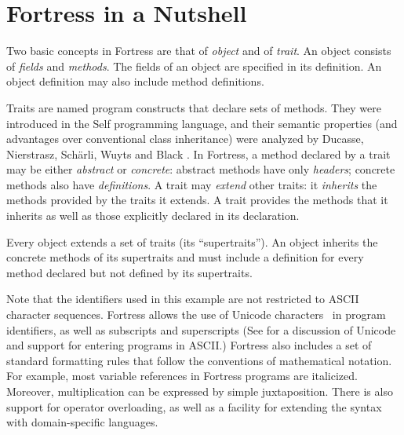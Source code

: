 %
%
%
%

\section{Fortress in a Nutshell}


Two basic concepts in Fortress are that of
\emph{object} and of \emph{trait}.
An object consists of \emph{fields} and \emph{methods}.
The fields of an object are specified in its definition.
An object definition may also include method definitions.

Traits are named
program constructs that declare sets of methods.
They were introduced in the Self programming language,
and their semantic properties
(and advantages over conventional class inheritance)
were analyzed
by Ducasse, Nierstrasz, Sch{\"a}rli, Wuyts and
  Black \cite{traits}.
In Fortress, a method declared by a trait
may be either \emph{abstract}
or \emph{concrete}:
abstract methods have only
\emph{headers};
concrete methods also have
\emph{definitions}.
A trait may \emph{extend} other traits:
it \emph{inherits}
the methods provided by the traits it extends.
A trait provides the methods that it inherits
as well as those explicitly declared in its declaration.

Every object extends a set of traits (its ``supertraits'').
An object inherits the concrete methods of its supertraits
and must include a definition for every method
declared but not defined by its supertraits.

Note that the identifiers used in this example
are not restricted to ASCII character sequences.
Fortress allows the use of Unicode characters~\cite{Unicode}
in program identifiers, as well as subscripts and superscripts
(See  for a discussion
of Unicode and support for entering programs in
ASCII.)
Fortress also includes a set of standard formatting rules
that follow the conventions of mathematical notation. For example,
most variable references in Fortress programs are italicized.
Moreover, multiplication
can be expressed by simple juxtaposition.
There is also support for operator overloading,
as well as a facility for  extending
the syntax with domain-specific languages.

